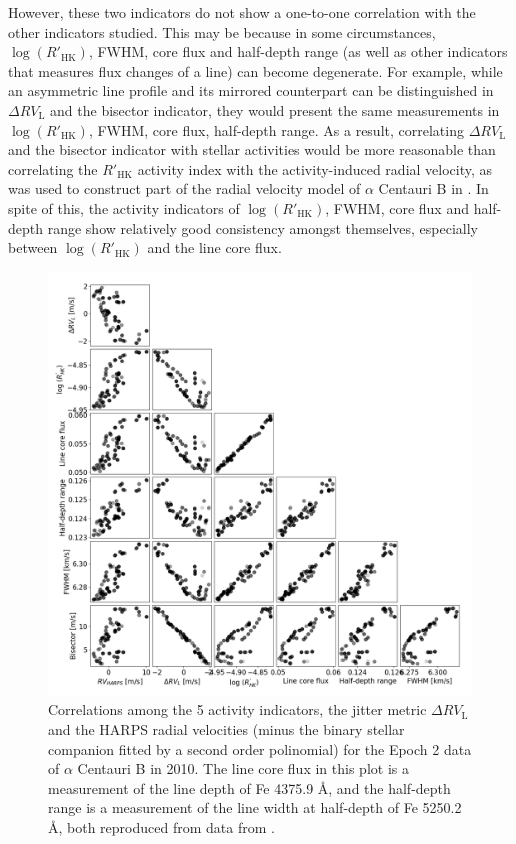 However, these two indicators do not show a one-to-one correlation with the other indicators studied. This may be because in some circumstances, $\log (R'_\text{HK})$, FWHM, core flux and half-depth range (as well as other indicators that measures flux changes of a line) can become degenerate. For example, while an asymmetric line profile and its mirrored counterpart can be distinguished in $\Delta RV_\text{L}$ and the bisector indicator, they would present the same measurements in $\log (R'_\text{HK})$, FWHM, core flux, half-depth range. As a result, correlating $\Delta RV_\text{L}$ and the bisector indicator with stellar activities would be more reasonable than correlating the $R'_\text{HK}$ activity index with the activity-induced radial velocity, as was used to construct part of the radial velocity model of $\alpha$ Centauri B in \cite{Dumusque_Centauri_B}. In spite of this, the activity indicators of $\log (R'_\text{HK})$, FWHM, core flux and half-depth range show relatively good consistency amongst themselves, especially between $\log (R'_\text{HK})$ and the line core flux. 

\begin{figure}[tbp]
\centering
\includegraphics[width = 1.0 \linewidth]
{./Figures/Methods/Correlogram2_indicator_2010.png}
\caption[Correlations among the activity indicators and the jitter metric]
		{Correlations among the 5 activity indicators, the jitter metric $\Delta RV_\text{L}$ and the HARPS radial velocities (minus the binary stellar companion fitted by a second order polinomial) for the Epoch 2 data of $\alpha$ Centauri B in 2010. The line core flux in this plot is a measurement of the line depth of Fe 4375.9 \AA, and the half-depth range is a measurement of the line width at half-depth of Fe 5250.2 \AA, both reproduced from data from \cite{Wise2018}.}
\label{fig:Correlogram_indicator}
\end{figure} 

